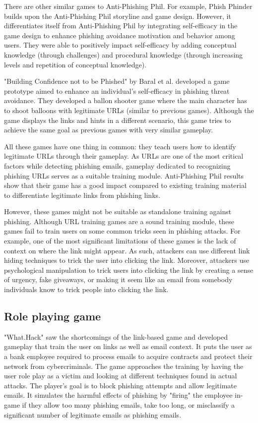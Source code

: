 There are other similar games to Anti-Phishing Phil. For example, Phish Phinder \cite{phish_phinder} builds upon the Anti-Phishing Phil storyline and game design. However, it differentiates itself from Anti-Phishing Phil by integrating self-efficacy in the game design to enhance phishing avoidance motivation and behavior among users. They were able to positively impact self-efficacy by adding conceptual knowledge (through challenges) and procedural knowledge (through increasing levels and repetition of conceptual knowledge).

"Building Confidence not to be Phished" \cite{gamified_approach} by Baral et al. developed a game prototype aimed to enhance an individual's self-efficacy in phishing threat avoidance. They developed a ballon shooter game where the main character has to shoot balloons with legitimate URLs (similar to previous games). Although the game displays the links and hints in a different scenario, this game tries to achieve the same goal as previous games with very similar gameplay.

All these games have one thing in common: they teach users how to identify legitimate URLs through their gameplay. As URLs are one of the most critical factors while detecting phishing emails, gameplay dedicated to recognizing phishing URLs serves as a suitable training module. Anti-Phishing Phil results show that their game has a good impact compared to existing training material to differentiate legitimate links from phishing links.

However, these games might not be suitable as standalone training against phishing. Although URL training games are a sound training module, these games fail to train users on some common tricks seen in phishing attacks. For example, one of the most significant limitations of these games is the lack of context on where the link might appear. As such, attackers can use different link hiding techniques to trick the user into clicking the link. Moreover, attackers use psychological manipulation to trick users into clicking the link by creating a sense of urgency, fake giveaways, or making it seem like an email from somebody individuals know to trick people into clicking the link.

\subsection{Role playing game}
"What.Hack" \cite{what_hack} saw the shortcomings of the link-based game and developed gameplay that train the user on links as well as email context. It puts the user as a bank employee required to process emails to acquire contracts and protect their network from cybercriminals. The game approaches the training by having the user role play as a victim and looking at different techniques found in actual attacks. The player's goal is to block phishing attempts and allow legitimate emails. It simulates the harmful effects of phishing by "firing" the employee in-game if they allow too many phishing emails, take too long, or misclassify a significant number of legitimate emails as phishing emails.

